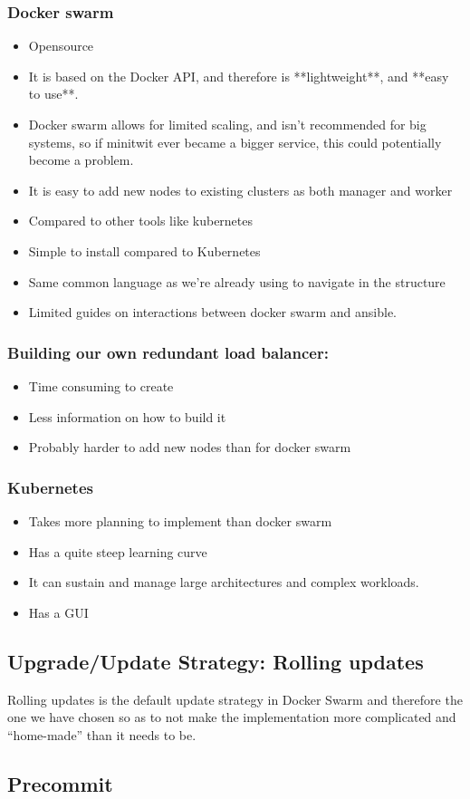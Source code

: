 \subsubsection{Docker swarm}

\cite{ansible:dockerswarm}
\begin{itemize}
    \item Opensource
    \item It is based on the Docker API, and therefore is **lightweight**, and **easy to use**.
    \item Docker swarm allows for limited scaling, and isn't recommended for big systems, so if minitwit ever became a bigger service, this could potentially become a problem.
    \item It is easy to add new nodes to existing clusters as both manager and worker
    \item Compared to other tools like kubernetes
    \item Simple to install compared to Kubernetes
    \item Same common language as we're already using to navigate in the structure
    \item Limited guides on interactions between docker swarm and ansible.
\end{itemize}

\subsubsection{Building our own redundant load balancer:}
\begin{itemize}
    \item Time consuming to create
    \item Less information on how to build it
    \item Probably harder to add new nodes than for docker swarm
\end{itemize}

\subsubsection{Kubernetes}
\begin{itemize}
    \item Takes more planning to implement than docker swarm
    \item Has a quite steep learning curve
    \item It can sustain and manage large architectures and complex workloads.
    \item Has a GUI
\end{itemize}

\subsection{Upgrade/Update Strategy: Rolling updates}

Rolling updates is the default update strategy in Docker Swarm and therefore the one we have chosen so as to not make the implementation more complicated and “home-made” than it needs to be.

\subsection{Precommit}
